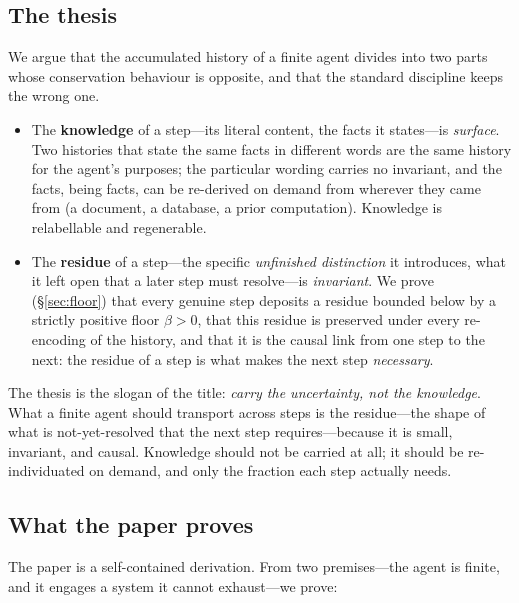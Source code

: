\documentclass[11pt,a4paper]{article}
\theoremstyle{thmstyle}
\theoremstyle{definition}
\theoremstyle{remark}
\newcommand{\flo}{\beta}                %
\begin{document}
\subsection{The thesis}

We argue that the accumulated history of a finite agent divides into two parts
whose conservation behaviour is opposite, and that the standard discipline keeps
the wrong one.

\begin{itemize}[leftmargin=1.4em,itemsep=2pt]
\item The \textbf{knowledge} of a step---its literal content, the facts it
states---is \emph{surface}. Two histories that state the same facts in different
words are the same history for the agent's purposes; the particular wording
carries no invariant, and the facts, being facts, can be re-derived on demand
from wherever they came from (a document, a database, a prior computation).
Knowledge is relabellable and regenerable.
\item The \textbf{residue} of a step---the specific \emph{unfinished
distinction} it introduces, what it left open that a later step must resolve---is
\emph{invariant}. We prove (\S\ref{sec:floor}) that every genuine step deposits
a residue bounded below by a strictly positive floor $\flo>0$, that this residue
is preserved under every re-encoding of the history, and that it is the causal
link from one step to the next: the residue of a step is what makes the next
step \emph{necessary}.
\end{itemize}

The thesis is the slogan of the title: \emph{carry the uncertainty, not the
knowledge}. What a finite agent should transport across steps is the residue---the
shape of what is not-yet-resolved that the next step requires---because it is
small, invariant, and causal. Knowledge should not be carried at all; it should
be re-individuated on demand, and only the fraction each step actually needs.

\subsection{What the paper proves}

The paper is a self-contained derivation. From two premises---the agent is
finite, and it engages a system it cannot exhaust---we prove:
\end{document}
